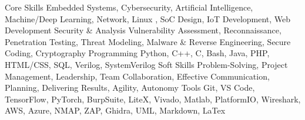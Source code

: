 

\begin{cvskills}
  \cvskill
    {Core Skills} %
    {Embedded Systems, Cybersecurity, Artificial Intelligence, Machine/Deep Learning, Network, Linux
   , SoC Design, IoT Development, Web Development} %
  \cvskill
    {Security \& Analysis} %
    {Vulnerability Assessment, Reconnaissance, Penetration Testing, Threat
    Modeling, Malware \& Reverse Engineering, Secure Coding, Cryptography} %
  \cvskill
    {Programming}
    {Python, C++, C, Bash, Java, PHP, HTML/CSS, SQL, Verilog, SystemVerilog}
  \cvskill
    {Soft Skills}
    {Problem-Solving, Project Management, Leadership, Team Collaboration,
    Effective Communication, Planning, Delivering Results, Agility, Autonomy}
  \cvskill
    {Tools} %
    {Git, VS Code, TensorFlow, PyTorch, BurpSuite, LiteX, Vivado, Matlab,
    PlatformIO, Wireshark, AWS, Azure, NMAP, ZAP, Ghidra, UML, Markdown, LaTex } %
\end{cvskills}
